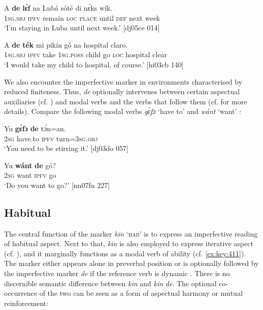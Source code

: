 \ea%
    \label{ex:key:338}
    \gll A    \textbf{de}  \textbf{lɛ́f}    na  Lubá  sóté    di  nɛ́ks    wík.\\
\textsc{1sg.sbj}  \textsc{ipfv}  remain  \textsc{loc}  \textsc{place}  until  \textsc{def}  next    week\\

\glt ‘I’m staying in Luba until next week.’ [dj05ce 014]
\z


\ea%
    \label{ex:key:339}
    \gll \MakeUppercase{A}   \textbf{de} \textbf{ték} mi    pikín  gó  na  hospital  claro.\\
\textsc{1sg.sbj}  \textsc{ipfv}  take  \textsc{1sg.poss}  child  go  \textsc{loc}  hospital  clear\\

\glt ‘I would take my child to hospital, of course.’ [hi03cb 140]
\z

We also encounter the imperfective marker in environments characterised by reduced finiteness{\fff}. Thus, \textit{de} optionally intervenes between certain aspectual auxiliaries (cf. ) and modal verbs and the verbs that follow them (cf.  for more details). Compare the following modal verbs \textit{gɛ́fɔ} ‘have to’  and \textit{wánt} ‘want’ :


\ea%
    \label{ex:key:340}
    \gll Yu  \textbf{gɛ́fɔ}    \textbf{de}  tɔ́n=an.\\
\textsc{2sg}  have.to  \textsc{ipfv}  turn=\textsc{3sg.obj}\\

\glt ‘You need to be stirring it.’ [dj03do 057]
\z


\ea%
    \label{ex:key:341}
    \gll Yu  \textbf{wánt} \textbf{de}  gó?\\
\textsc{2sg}  want  \textsc{ipfv}  go\\


\glt ‘Do you want to go?’ [nn07fn 227]\\
\z
\subsection{Habitual}\label{sec:6.3.5}

The central function of the marker \textit{kin} ‘\textsc{hab}’ is to express an  imperfective reading of habitual aspect. Next to that, \textit{kin} is also employed to express iterative aspect (cf. ), and it marginally functions as a modal verb of ability (cf. \ref{ex:key:411}). The marker either appears alone in preverbal position  or is optionally followed by the imperfective marker \textit{de} if the reference verb is dynamic . There is no discernible semantic difference between \textit{kin} and \textit{kin} \textit{de}. The optional co-occurrence of the two can be seen as a form of aspectual harmony or mutual reinforcement:


